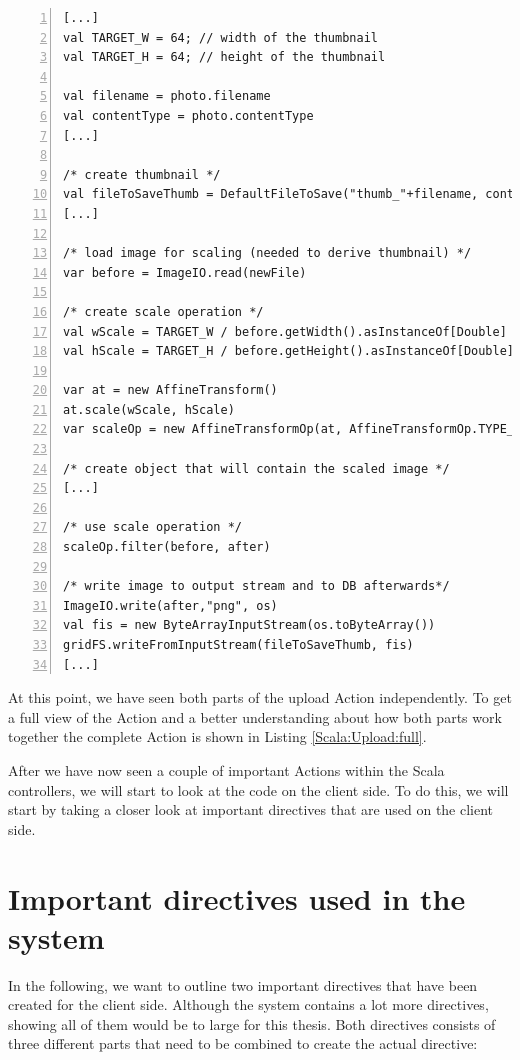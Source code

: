 \begin{lstlisting}[numbers=left,caption={Snippet of the upload Action of the FileController for creating thumbnails},label=Scala:Upload:Thumb,frame=tlbr,breaklines]
[...]
val TARGET_W = 64; // width of the thumbnail
val TARGET_H = 64; // height of the thumbnail

val filename = photo.filename
val contentType = photo.contentType
[...]

/* create thumbnail */
val fileToSaveThumb = DefaultFileToSave("thumb_"+filename, contentType)
[...]

/* load image for scaling (needed to derive thumbnail) */
var before = ImageIO.read(newFile)

/* create scale operation */
val wScale = TARGET_W / before.getWidth().asInstanceOf[Double]
val hScale = TARGET_H / before.getHeight().asInstanceOf[Double]

var at = new AffineTransform()
at.scale(wScale, hScale)
var scaleOp = new AffineTransformOp(at, AffineTransformOp.TYPE_BILINEAR)

/* create object that will contain the scaled image */
[...]

/* use scale operation */
scaleOp.filter(before, after)

/* write image to output stream and to DB afterwards*/
ImageIO.write(after,"png", os)
val fis = new ByteArrayInputStream(os.toByteArray())
gridFS.writeFromInputStream(fileToSaveThumb, fis)
[...]
\end{lstlisting}

At this point, we have seen both parts of the upload Action independently. To get a full view of the Action and a better understanding about how both parts work together the complete Action is shown in Listing \ref{Scala:Upload:full}.

After we have now seen a couple of important Actions within the Scala controllers, we will start to look at the code on the client side. To do this, we will start by taking a closer look at important directives that are used on the client side. 

\section{Important directives used in the system}
\label{usedDirectives}
In the following, we want to outline two important directives that have been created for the client side. Although the system contains a lot more directives, showing all of them would be to large for this thesis. Both directives consists of three different parts that need to be combined to create the actual directive:

